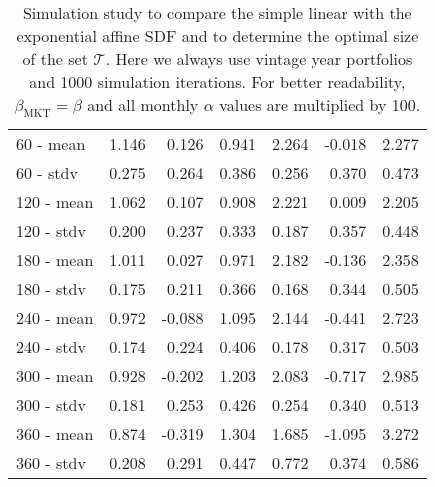 \documentclass[12pt]{article}
\begin{document}
\begin{table}[ht]
\begin{tabular}{lrrrrrr}
		\hline
		60 - mean & 1.146 & 0.126 & 0.941 & 2.264 & -0.018 & 2.277 \\ 
		60 - stdv & 0.275 & 0.264 & 0.386 & 0.256 & 0.370 & 0.473 \\ 
		\hline
		120 - mean & 1.062 & 0.107 & 0.908 & 2.221 & 0.009 & 2.205 \\ 
		120 - stdv & 0.200 & 0.237 & 0.333 & 0.187 & 0.357 & 0.448 \\ 
		\hline
		180 - mean & 1.011 & 0.027 & 0.971 & 2.182 & -0.136 & 2.358 \\ 
		180 - stdv & 0.175 & 0.211 & 0.366 & 0.168 & 0.344 & 0.505 \\ 
		\hline
		240 - mean & 0.972 & -0.088 & 1.095 & 2.144 & -0.441 & 2.723 \\ 
		240 - stdv & 0.174 & 0.224 & 0.406 & 0.178 & 0.317 & 0.503 \\ 
		\hline
		300 - mean & 0.928 & -0.202 & 1.203 & 2.083 & -0.717 & 2.985 \\ 
		300 - stdv & 0.181 & 0.253 & 0.426 & 0.254 & 0.340 & 0.513 \\ 
		\hline
		360 - mean & 0.874 & -0.319 & 1.304 & 1.685 & -1.095 & 3.272 \\ 
		360 - stdv & 0.208 & 0.291 & 0.447 & 0.772 & 0.374 & 0.586 \\ 
		\hline
		\hline
	\end{tabular}
	\caption{
		Simulation study to compare the simple linear with the exponential affine SDF and to determine the optimal size of the set $\mathcal{T}$.
		Here we always use vintage year portfolios and 1000 simulation iterations.
		For better readability, $\beta_{\mathrm{MKT}}=\beta$ and all monthly $\alpha$ values are multiplied by 100.
	} 
	\label{tab:simulation_study}
\end{table}
\end{document}
